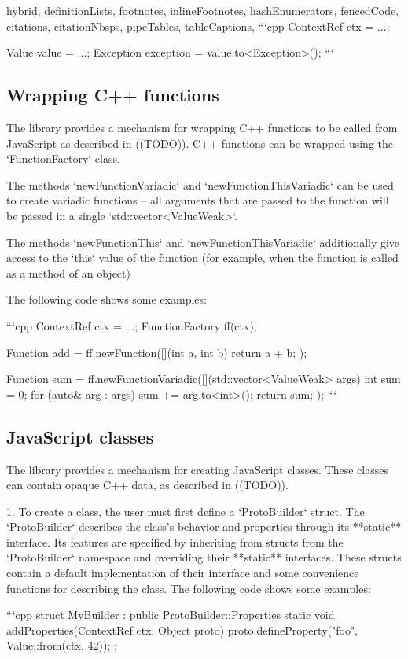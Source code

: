 \begin{markdown*}{%
  hybrid,
  definitionLists,
  footnotes,
  inlineFootnotes,
  hashEnumerators,
  fencedCode,
  citations,
  citationNbsps,
  pipeTables,
  tableCaptions,
}
```cpp
ContextRef ctx = ...;

Value value = ...;
Exception exception = value.to<Exception>();
```

\subsection{Wrapping C++ functions}

The library provides a mechanism for wrapping C++ functions to be called from JavaScript as described in ((TODO)). C++ functions can be wrapped using the `FunctionFactory` class.

The methods `newFunctionVariadic` and `newFunctionThisVariadic` can be used to create variadic functions -- all arguments that are
passed to the function will be passed in a single `std::vector<ValueWeak>`.

The methods `newFunctionThis` and `newFunctionThisVariadic` additionally give access to the `this` value of the function (for example,
when the function is called as a method of an object)

The following code shows some examples:

```cpp
ContextRef ctx = ...;
FunctionFactory ff(ctx);

Function add = ff.newFunction([](int a, int b) { return a + b; });

Function sum = ff.newFunctionVariadic([](std::vector<ValueWeak> args) {
    int sum = 0;
    for (auto& arg : args) {
        sum += arg.to<int>();
    }
    return sum;
});
```

\subsection{JavaScript classes}

The library provides a mechanism for creating JavaScript classes. These classes can contain opaque C++ data, as described in ((TODO)).

  1. To create a class, the user must first define a `ProtoBuilder` struct. The `ProtoBuilder` describes the class's behavior and properties through its **static** interface. Its features are specified by inheriting from structs from the `ProtoBuilder` namespace and overriding their **static** interfaces. These structs contain a default implementation of their interface and some convenience functions for describing the class. The following code shows some examples:

```cpp
struct MyBuilder : public ProtoBuilder::Properties {
    static void addProperties(ContextRef ctx, Object proto) {
        proto.defineProperty("foo", Value::from(ctx, 42));
    }
};


\end{markdown*}
